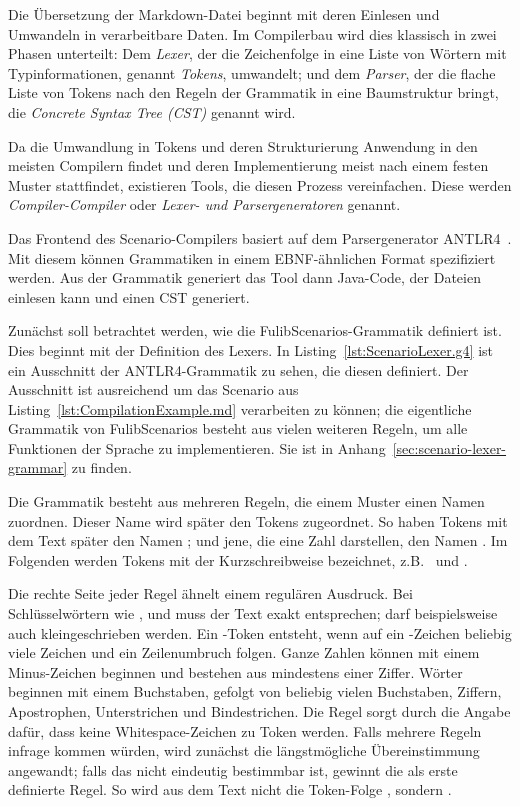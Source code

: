 Die Übersetzung der Markdown-Datei beginnt mit deren Einlesen und Umwandeln in verarbeitbare Daten.
Im Compilerbau wird dies klassisch in zwei Phasen unterteilt:
Dem \emph{Lexer}, der die Zeichenfolge in eine Liste von Wörtern mit Typinformationen, genannt \emph{Tokens}, umwandelt;
und dem \emph{Parser}, der die flache Liste von Tokens nach den Regeln der Grammatik in eine Baumstruktur bringt,
die \emph{Concrete Syntax Tree (CST)} genannt wird.

Da die Umwandlung in Tokens und deren Strukturierung Anwendung in den meisten Compilern findet
und deren Implementierung meist nach einem festen Muster stattfindet,
existieren Tools, die diesen Prozess vereinfachen.
Diese werden \emph{Compiler-Compiler} oder \emph{Lexer- und Parsergeneratoren} genannt.

Das Frontend des Scenario-Compilers basiert auf dem Parsergenerator ANTLR4~\cite{antlr4-reference}.
Mit diesem können Grammatiken in einem EBNF-ähnlichen Format spezifiziert werden.
Aus der Grammatik generiert das Tool dann Java-Code, der Dateien einlesen kann und einen CST generiert.

Zunächst soll betrachtet werden, wie die FulibScenarios-Grammatik definiert ist.
Dies beginnt mit der Definition des Lexers.
In Listing~\ref{lst:ScenarioLexer.g4} ist ein Ausschnitt der ANTLR4-Grammatik zu sehen, die diesen definiert.
Der Ausschnitt ist ausreichend um das Scenario aus Listing~\ref{lst:CompilationExample.md} verarbeiten zu können;
die eigentliche Grammatik von FulibScenarios besteht aus vielen weiteren Regeln, um alle Funktionen der Sprache zu implementieren.
Sie ist in Anhang~\ref{sec:scenario-lexer-grammar} zu finden.


Die Grammatik besteht aus mehreren Regeln, die einem Muster einen Namen zuordnen.
Dieser Name wird später den Tokens zugeordnet.
So haben Tokens mit dem Text  später den Namen ;
und jene, die eine Zahl darstellen, den Namen .
Im Folgenden werden Tokens mit der Kurzschreibweise  bezeichnet,
z.B.\  und .

Die rechte Seite jeder Regel ähnelt einem regulären Ausdruck.
Bei Schlüsselwörtern wie ,  und  muss der Text exakt entsprechen;
 darf beispielsweise auch kleingeschrieben werden.
Ein -Token entsteht, wenn auf ein \code{#}-Zeichen beliebig viele Zeichen und ein Zeilenumbruch folgen.
Ganze Zahlen können mit einem Minus-Zeichen beginnen und bestehen aus mindestens einer Ziffer.
Wörter beginnen mit einem Buchstaben, gefolgt von beliebig vielen Buchstaben, Ziffern, Apostrophen, Unterstrichen und Bindestrichen.
Die Regel  sorgt durch die Angabe  dafür, dass keine Whitespace-Zeichen zu Token werden.
Falls mehrere Regeln infrage kommen würden, wird zunächst die längstmögliche Übereinstimmung angewandt;
falls das nicht eindeutig bestimmbar ist, gewinnt die als erste definierte Regel.
So wird aus dem Text  nicht die Token-Folge , sondern .

